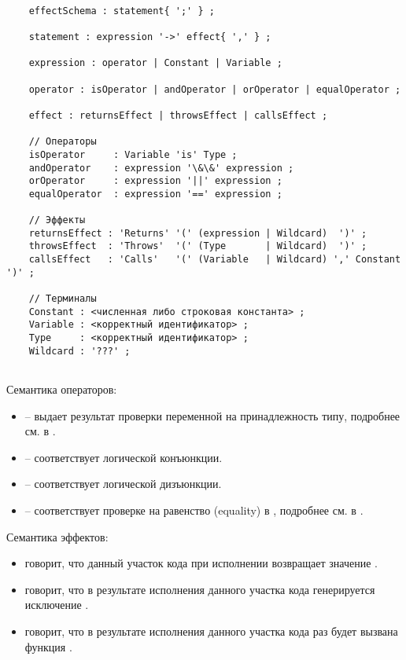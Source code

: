 
\begin{verbatim}

    effectSchema : statement{ ';' } ;
    
    statement : expression '->' effect{ ',' } ;
    
    expression : operator | Constant | Variable ;
    
    operator : isOperator | andOperator | orOperator | equalOperator ;
    
    effect : returnsEffect | throwsEffect | callsEffect ;
      
    // Операторы
    isOperator     : Variable 'is' Type ;
    andOperator    : expression '\&\&' expression ;
    orOperator     : expression '||' expression ;
    equalOperator  : expression '==' expression ;
    
    // Эффекты
    returnsEffect : 'Returns' '(' (expression | Wildcard)  ')' ;
    throwsEffect  : 'Throws'  '(' (Type       | Wildcard)  ')' ;
    callsEffect   : 'Calls'   '(' (Variable   | Wildcard) ',' Constant ')' ;
    
    // Терминалы
    Constant : <численная либо строковая константа> ; 
    Variable : <корректный идентификатор> ;        
    Type     : <корректный идентификатор> ;
    Wildcard : '???' ;
    
\end{verbatim}

Семантика операторов:

\begin{itemize}
    \item {} -- выдает результат проверки переменной на принадлежность типу, подробнее см. в \cite{kotlin:typechecks}.
    
    \item {} -- соответствует логической конъюнкции.
    
    \item {} -- соответствует логической дизъюнкции.
    
    \item {} -- соответствует проверке на равенство (equality) в , подробнее см. в \cite{kotlin:equality}.
\end{itemize}

Семантика эффектов:

\begin{itemize}
    \item {} говорит, что данный участок кода при исполнении возвращает значение .
    
    \item {} говорит, что в результате исполнения данного участка кода генерируется исключение .
    
    \item {} говорит, что в результате исполнения данного участка кода  раз будет вызвана функция .
\end{itemize}

